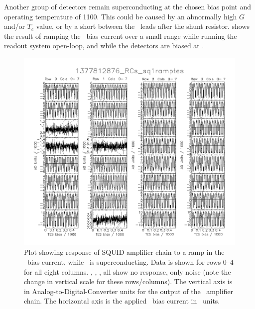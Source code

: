 Another group of detectors remain superconducting at the chosen bias point and operating temperature of \SI{1100}{\mK}.
This could be caused by an abnormally high $G$ and/or $T_c$ value, or by a short between the \TES\ leads after the shunt resistor.
 shows the result of ramping the \TES\ bias current over a small range while running the readout system open-loop, and while the detectors are biased at \SOC.

\begin{figure}
\centering
\includegraphics[width=\textwidth]{./images/1377812876_RCs_sq1ramptes_00.png}
\caption[\SQUID\ response to \TES\ bias ramp (superconducting)]{
  Plot showing response of SQUID amplifier chain to a ramp in the \TES\ bias current, while \TES\ is superconducting.
  Data is shown for rows 0--4 for all eight columns.
  , , ,  all show no response, only noise (note the change in vertical scale for these rows/columns).
  The vertical axis is in Analog-to-Digital-Converter units for the output of the \SQUID\ amplifier chain.
  The horizontal axis is the applied \TES\ bias current in \DAC\ units.
}
\label{fig:tes-bias-ramp-sc}
\end{figure}

